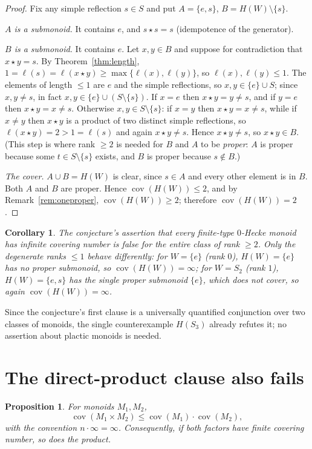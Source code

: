 \documentclass[11pt]{article}
\newtheorem{corollary}[theorem]{Corollary}
\newtheorem{proposition}[theorem]{Proposition}
\theoremstyle{definition}
\theoremstyle{remark}
\newcommand{\St}{\star}
\newcommand{\cov}{\operatorname{cov}}
\DeclareMathOperator{\len}{\ell}
\begin{document}
\begin{proof}
Fix any simple reflection $s\in S$ and put $A=\{e,s\}$, $B=H(W)\setminus\{s\}$.

\emph{$A$ is a submonoid.} It contains $e$, and $s\St s=s$ (idempotence of the
generator).

\emph{$B$ is a submonoid.} It contains $e$. Let $x,y\in B$ and suppose for
contradiction that $x\St y=s$. By Theorem~\ref{thm:length},
$1=\len(s)=\len(x\St y)\ge\max\{\len(x),\len(y)\}$, so
$\len(x),\len(y)\le 1$. The elements of length $\le 1$ are $e$ and the simple
reflections, so $x,y\in\{e\}\cup S$; since $x,y\ne s$, in fact
$x,y\in\{e\}\cup(S\setminus\{s\})$. If $x=e$ then $x\St y=y\ne s$, and if
$y=e$ then $x\St y=x\ne s$. Otherwise $x,y\in S\setminus\{s\}$: if $x=y$ then
$x\St y=x\ne s$, while if $x\ne y$ then $x\St y$ is a product of two distinct
simple reflections, so $\len(x\St y)=2>1=\len(s)$ and again $x\St y\ne s$.
Hence $x\St y\ne s$, so $x\St y\in B$. (This step is where rank $\ge 2$ is
needed for $B$ and $A$ to be \emph{proper}: $A$ is proper because some
$t\in S\setminus\{s\}$ exists, and $B$ is proper because $s\notin B$.)

\emph{The cover.} $A\cup B=H(W)$ is clear, since $s\in A$ and every other
element is in $B$. Both $A$ and $B$ are proper. Hence $\cov(H(W))\le 2$, and by
Remark~\ref{rem:oneproper}, $\cov(H(W))\ge 2$; therefore $\cov(H(W))=2$.
\end{proof}

\begin{corollary}
The conjecture's assertion that every finite-type $0$-Hecke monoid has infinite
covering number is false for the entire class of rank $\ge 2$. Only the
degenerate ranks $\le 1$ behave differently: for $W=\{e\}$ (rank $0$),
$H(W)=\{e\}$ has no proper submonoid, so $\cov(H(W))=\infty$; for
$W=S_2$ (rank $1$), $H(W)=\{e,s\}$ has the single proper submonoid $\{e\}$,
which does not cover, so again $\cov(H(W))=\infty$.
\end{corollary}

Since the conjecture's first clause is a universally quantified conjunction
over two classes of monoids, the single counterexample $H(S_3)$ already
refutes it; no assertion about plactic monoids is needed.

\section{The direct-product clause also fails}

\begin{proposition}\label{prop:product}
For monoids $M_1,M_2$,
\[
\cov(M_1\times M_2)\le \cov(M_1)\cdot\cov(M_2),
\]
with the convention $n\cdot\infty=\infty$. Consequently, if both factors have
finite covering number, so does the product.
\end{proposition}
\end{document}
